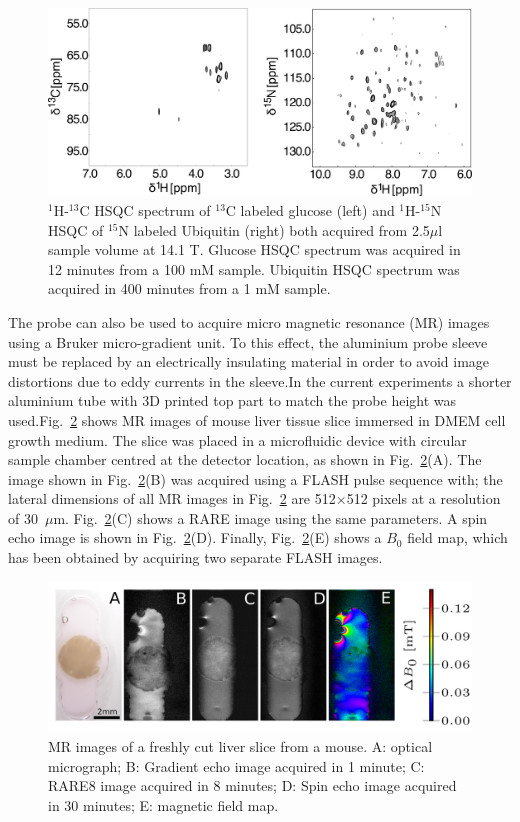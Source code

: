 \documentclass[preprint,5p]{elsarticle}
\newcommand{\fig}[1]{Fig.~\ref{#1}}
\begin{document}
\begin{figure} \centering
\includegraphics[width=\linewidth,keepaspectratio=true]{./figures/ms5n17-tlp-sp-180612-HSQCspect.png}
\caption{ $^1$H-$^{13}$C HSQC spectrum of $^{13}$C labeled glucose (left) and
$^1$H-$^{15}$N HSQC of $^{15}$N labeled Ubiquitin (right) both acquired from
2.5$\mu$l sample volume at 14.1 T. Glucose HSQC spectrum was acquired in 12
minutes from a 100 mM sample. Ubiquitin HSQC spectrum was acquired in 400
minutes from a 1 mM sample.} \label{fig:HSQC} \end{figure}
\cbdelete
The probe can also be used to acquire micro magnetic resonance (MR) images using
a Bruker micro-gradient unit. To this effect, the aluminium probe sleeve must be
replaced by an electrically insulating material in order to avoid image
distortions due to eddy currents in the sleeve.\cbstart In the current experiments a shorter aluminium tube with 3D printed top part to match the probe height was used.\cbend  \fig{fig:tisli} shows MR images
of mouse liver tissue slice immersed in DMEM cell growth medium. The slice was
placed in a microfluidic device with circular sample chamber centred at the
detector location, as shown in \fig{fig:tisli}(A). The image shown in
\fig{fig:tisli}(B) was acquired using a FLASH pulse sequence with; the lateral dimensions of all MR images in \fig{fig:tisli} are 512$\times$512 pixels at a resolution of 30~$\mu$m. \fig{fig:tisli}(C) shows a
RARE image using the same parameters. A spin echo image is shown in
\fig{fig:tisli}(D). Finally, \fig{fig:tisli}(E) shows a
$B_0$ field map, which has been obtained by acquiring two separate FLASH images.


\begin{figure}
\centering
\includegraphics[width=\linewidth,keepaspectratio=true]{./figures/ms5n17-tisli-im-180511.png}
\caption{MR images of a freshly cut liver slice from a mouse. A: optical micrograph; B: Gradient echo image acquired in 1 minute; C: RARE8 image acquired in 8 minutes; D: Spin echo image acquired in 30 minutes; E: magnetic field map.}
\label{fig:tisli}
\end{figure}
\end{document}
